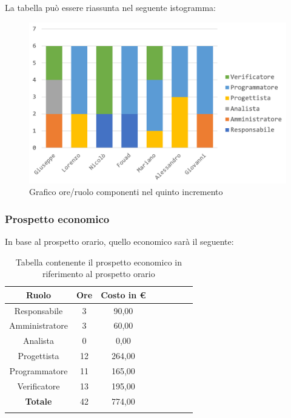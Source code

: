 		La tabella può essere riassunta nel seguente istogramma:
		\begin{figure}[H]
			\centering
			\includegraphics[width=0.8\linewidth]{./images/preventivo/incremento5-1.png}
			\caption{Grafico ore/ruolo componenti nel quinto incremento}
			\label{fig:grafico suddivione ruoli incremento V}
		\end{figure}
		
		\subsubsection{Prospetto economico}
		In base al prospetto orario, quello economico sarà il seguente: 
		
		\begin{longtable}{|c|c|c|c|c|c|c|c|}
			\hline
			\rowcolor{lighter-grayer}
			\textbf{Ruolo} & \textbf{Ore} & \textbf{Costo in € } \\
			\hline
			\endfirsthead
			
			\hline
			Responsabile 	    & 3 & 90,00\\
			\hline 
			\hline
			Amministratore	   & 3 & 60,00\\
			\hline
			\hline
			Analista 				& 0 & 0,00\\
			\hline
			\hline
			Progettista 		   & 12 & 264,00\\
			\hline
			\hline
			Programmatore 	  & 11 & 165,00\\
			\hline
			\hline
			Verificatore 		   & 13 & 195,00\\
			\hline
			\textbf{Totale} 	 & 42 & 774,00\\
			\hline
			\caption{Tabella contenente il prospetto economico in riferimento al prospetto orario}
		\end{longtable}
		\pagebreak
		
